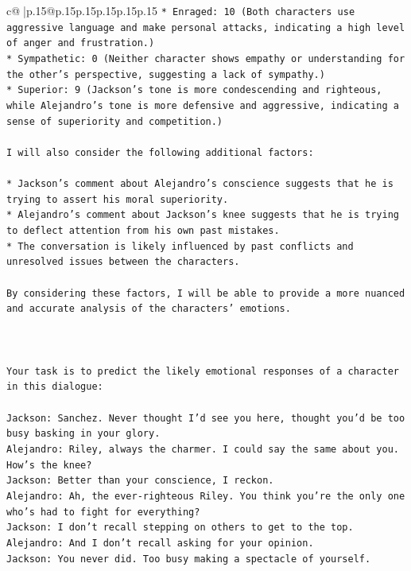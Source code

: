 \documentclass{article}
\begin{document}
{\begin{supertabular}{c@{$\;$}|p{.15\linewidth}@{}p{.15\linewidth}p{.15\linewidth}p{.15\linewidth}p{.15\linewidth}p{.15\linewidth}}
{{{\texttt{* Enraged: 10 (Both characters use aggressive language and make personal attacks, indicating a high level of anger and frustration.)} \\
\texttt{* Sympathetic: 0 (Neither character shows empathy or understanding for the other's perspective, suggesting a lack of sympathy.)} \\
\texttt{* Superior: 9 (Jackson's tone is more condescending and righteous, while Alejandro's tone is more defensive and aggressive, indicating a sense of superiority and competition.)} \\
\\ 
\texttt{I will also consider the following additional factors:} \\
\\ 
\texttt{* Jackson's comment about Alejandro's conscience suggests that he is trying to assert his moral superiority.} \\
\texttt{* Alejandro's comment about Jackson's knee suggests that he is trying to deflect attention from his own past mistakes.} \\
\texttt{* The conversation is likely influenced by past conflicts and unresolved issues between the characters.} \\
\\ 
\texttt{By considering these factors, I will be able to provide a more nuanced and accurate analysis of the characters' emotions.} \\
\\ 
\\ 
\\ 
\texttt{Your task is to predict the likely emotional responses of a character in this dialogue:} \\
\\ 
\texttt{Jackson: Sanchez. Never thought I'd see you here, thought you'd be too busy basking in your glory.} \\
\texttt{Alejandro: Riley, always the charmer. I could say the same about you. How's the knee?} \\
\texttt{Jackson: Better than your conscience, I reckon.} \\
\texttt{Alejandro: Ah, the ever{-}righteous Riley. You think you're the only one who's had to fight for everything?} \\
\texttt{Jackson: I don't recall stepping on others to get to the top.} \\
\texttt{Alejandro: And I don't recall asking for your opinion.} \\
\texttt{Jackson: You never did. Too busy making a spectacle of yourself.} \\
}}}
\end{supertabular}}
\end{document}
